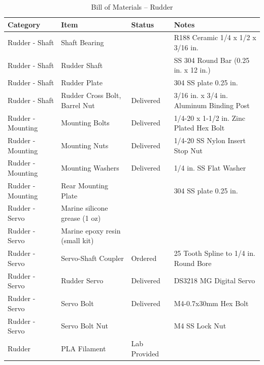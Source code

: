 
\begin{table}[htbp]
\label{tab:bom_rudder}
\centering
\caption{Bill of Materials -- Rudder}
\footnotesize
\begin{tabular}{|p{3.45cm}|p{5.5cm}|p{2.2cm}|p{4.75cm}|}
\hline
\textbf{Category} & \textbf{Item} & \textbf{Status} & \textbf{Notes} \\
\hline
Rudder - Shaft & Shaft Bearing & & R188 Ceramic 1/4 x 1/2 x 3/16 in. \\
\hline
Rudder - Shaft & Rudder Shaft & & SS 304 Round Bar (0.25 in. x 12 in.) \\
\hline
Rudder - Shaft & Rudder Plate & & 304 SS plate 0.25 in. \\
\hline
Rudder - Shaft & Rudder Cross Bolt, Barrel Nut & Delivered & 3/16 in. x 3/4 in. Aluminum Binding Post \\
\hline
Rudder - Mounting & Mounting Bolts & Delivered & 1/4-20 x 1-1/2 in. Zinc Plated Hex Bolt \\
\hline
Rudder - Mounting & Mounting Nuts & Delivered & 1/4-20 SS Nylon Insert Stop Nut \\
\hline
Rudder - Mounting & Mounting Washers & Delivered & 1/4 in. SS Flat Washer \\
\hline
Rudder - Mounting & Rear Mounting Plate & & 304 SS plate 0.25 in. \\
\hline
Rudder - Servo & Marine silicone grease (1 oz) & & \\
\hline
Rudder - Servo & Marine epoxy resin (small kit) & & \\
\hline
Rudder - Servo & Servo-Shaft Coupler & Ordered & 25 Tooth Spline to 1/4 in. Round Bore \\
\hline
Rudder - Servo & Rudder Servo & Delivered & DS3218 MG Digital Servo \\
\hline
Rudder - Servo & Servo Bolt & Delivered & M4-0.7x30mm Hex Bolt \\
\hline
Rudder - Servo & Servo Bolt Nut & & M4 SS Lock Nut \\
\hline
Rudder & PLA Filament & Lab Provided & \\
\hline
\end{tabular}
\end{table}

